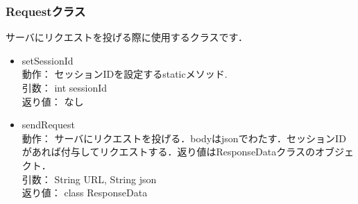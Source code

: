 \documentclass[a4j,titlepage]{jarticle}
\begin{document}
\subsubsection{Requestクラス}
サーバにリクエストを投げる際に使用するクラスです．
\begin{itemize}
\item setSessionId\\
動作： セッションIDを設定するstaticメソッド.\\
引数： int sessionId\\
返り値： なし

\item sendRequest\\
動作： サーバにリクエストを投げる．bodyはjsonでわたす．セッションIDがあれば付与してリクエストする．返り値はResponseDataクラスのオブジェクト．\\
引数： String URL, String json\\
返り値： class ResponseData
\end{itemize}
\end{document}
